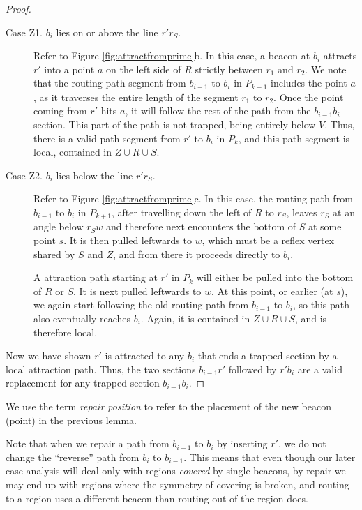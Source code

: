 \documentclass{article}
\begin{document}
\begin{proof}
		\begin{description}
		\item[Case Z1. $b_i$ lies on or above the line $r'r_S$.]
			Refer to Figure \ref{fig:attractfromprime}b. 
			In this case, a beacon at $b_i$ attracts $r'$ into a point $a$ on the left side
			of $R$ strictly between $r_1$ and $r_2$.  
			We note that the routing path segment from $b_{i-1}$ to $b_{i}$ in
			$P_{k+1}$ includes the point $a$, as it traverses the entire length of the
			segment $r_1$ to $r_2$.
			Once the point coming from $r'$ hits $a$, it
			will follow the rest of the path from the $b_{i-1}b_i$ section.
			This part of the path is not trapped, being entirely below $V$.
			Thus, there is a valid path segment from $r'$ to $b_i$ in $P_k$,
			and this path segment is local, contained in $Z \cup R \cup S$.
		
		\item[Case Z2. $b_i$ lies below the line $r'r_S$.]
			Refer to Figure \ref{fig:attractfromprime}c.
			In this case, the routing path from $b_{i-1}$ to $b_i$ in $P_{k+1}$,
			after travelling down the left of $R$ to $r_S$, leaves $r_S$ at an angle
			below $r_Sw$ and therefore next encounters the bottom of $S$ at some point $s$.
			It is then pulled leftwards to $w$, which must be a reflex vertex shared by $S$
			and $Z$, and from there it proceeds directly to $b_i$.
			
			A attraction path starting at $r'$ in $P_k$ will either be pulled into
			the bottom of $R$ or $S$.  It is next pulled leftwards to $w$.  At this
			point, or earlier (at $s$), we again start following the old routing path from $b_{i-1}$ to $b_i$, so this
			path also eventually reaches $b_i$.  Again, it is contained in  $Z \cup R \cup
			S$, and is therefore local.
		\end{description}
		
		Now we have shown $r'$ is attracted to any $b_{i}$ that ends a
		trapped section by a local attraction path.  Thus, the two sections
		$b_{i-1}r'$ followed by $r'b_i$ are a valid replacement for any trapped
		section $b_{i-1}b_i$.
	\end{proof} 

	We use the term \emph{repair position} to refer to the placement of the new
	beacon (point) in the previous lemma.
	
	Note that when we repair a path from $b_{i-1}$ to $b_{i}$ by inserting $r'$,
	we do not change the ``reverse'' path from $b_{i}$ to $b_{i-1}$.
	This means that even though our later case analysis will deal only with
	regions \emph{covered} by single beacons, by repair we may end up with regions
	where the symmetry of covering is broken, and routing to a region uses a
	different beacon than routing out of the region does.
\end{document}
